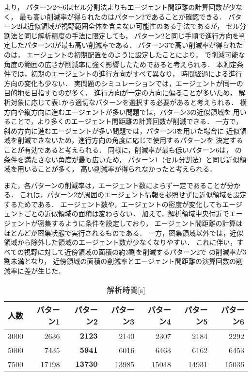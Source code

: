 より，
パターン2～6はセル分割法よりもエージェント間距離の計算回数が少なく，
最も高い削減率が得られたのはパターン2であることが確認できる．
パターン2は近似領域が視野範囲全体を含まない可能性のある手法であるが，
セル分割法と同じ解析精度の手法に限定しても，
パターン2と同じ手順で進行方向を判定したパターン3が最も高い削減率である．
パターン3で高い削減率が得られたのは，
エージェントの初期配置をのように設定したことにより，
で削減可能な角度の範囲の広さが削減率に強く影響したためであると考えられる．
本測定条件では，初期のエージェントの進行方向がすべて異なり，
時間経過による進行方向の変化も少ない．
実問題のシミュレーションでは，エージェントが同一の目的地を目指すものが多く，
進行方向が一定の方向に偏ることが多いため，
解析対象に応じて表1から適切なパターンを選択する必要があると考えられる．
横方向や縦方向に進むエージェントが多い問題では，パターン3の近似領域を
用いることで，より多くのエージェント間距離の計算回数が削減できる．
一方で，斜め方向に進むエージェントが多い問題では，パターン3を用いた場合に
近似領域を削減できないため，進行方向の角度に応じで使用するパターンを
決定することが有効であると考えられる．
同様に，削減率が最も低いパターン6は，
の条件を満たさない角度が最も広いため，
パターン1（セル分割法）と同じ近似領域を用いることが多く，
高い削減率が得られなかったと考えられる．

また，各パターンの削減率は，エージェント数によらず一定であることが分かる．
これは，パターン2が周囲のエージェント情報を参照せずに近似領域を設定するためである．
エージェント数や，エージェントの密度が変化してもエージェントごとの近似領域の面積は変わらない．
加えて，解析領域中央付近でエージェントが密集するように条件を設定しており，
エージェント間距離の計算はほとんどが密集状態で実行されるものである．
一方，密集領域以外では，近似領域から除外した領域のエージェント数が少なくなりやすい．
これに伴い，すべての視野に対して近傍領域の面積の約3割を削減するパターン2で
の削減率が3割未満となり，
近傍領域の面積の削減率とエージェント間距離の演算回数の削減率に差が生じた．

\begin{table*}[t]
  \caption{解析時間[s]}
  \label{tb:time_result_yobi}
  \begin{center}
    \begin{tabular}{c|r|r|r|r|r|r}
      \hline \hline
          人数 & パターン1 & パターン2 & パターン3 & パターン4 & パターン5 & パターン6  \\  \hline
          3000 & 2636      & $\mathbf{2123}$      & 2140      & 2307      &  2184     & 2292      \\  \hline
          5000 & 7435      & $\mathbf{5941}$      & 6016      & 6463      &  6162     & 6453      \\  \hline
          7500 & 17198     & $\mathbf{13730}$     & 13985     & 15048     & 14931     & 15036     \\  \hline
    \end{tabular}
  \end{center}
\end{table*}

